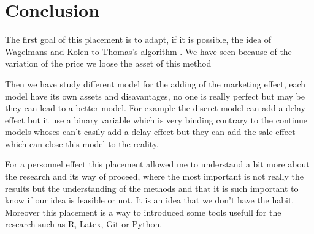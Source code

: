 \section*{Conclusion}

The first goal of this placement is to adapt, if it is possible, the idea of Wagelmans and Kolen \cite{Wagelmans&Kolen92} to Thomas's algorithm \cite{Thomas70}. We have seen because of the variation of the price we loose the asset of this method

Then we have study different model for the adding of the marketing effect, each model have its own assets and disavantages, no one is really perfect but may be they can lead to a better model. For example the discret model can add a delay effect but it use a binary variable which is very binding  contrary to the continue models whoses can't easily add a delay effect but they can add the sale effect which can close this model to the reality.

For a personnel effect this placement allowed me to understand a bit more about the research and its way of proceed, where the most important is not really the results but the understanding of the methods and that it is such important to know if our idea is feasible or not. It is an idea that we don't have the habit. Moreover this placement is a way to introduced some tools usefull for the research such as R, Latex, Git or Python. 